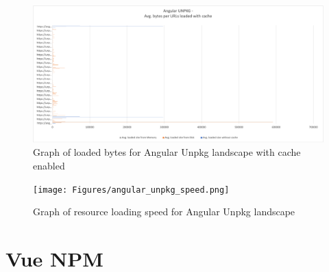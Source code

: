 \newpage
\begin{figure}[!h]
	\centering
	\includegraphics[width=1.4\textwidth, angle=90]{Figures/angular_unpkg_bytes_cache.png}
	\caption{Graph of loaded bytes for Angular Unpkg landscape with cache enabled}
	\label{fig:appendix_1_9}
\end{figure}
\newpage
\begin{figure}[!h]
	\centering
	\texttt{[image: Figures/angular\_unpkg\_speed.png]}
	\caption{Graph of resource loading speed for Angular Unpkg landscape}
	\label{fig:appendix_1_10}
\end{figure}
\newpage

\section{Vue NPM}


